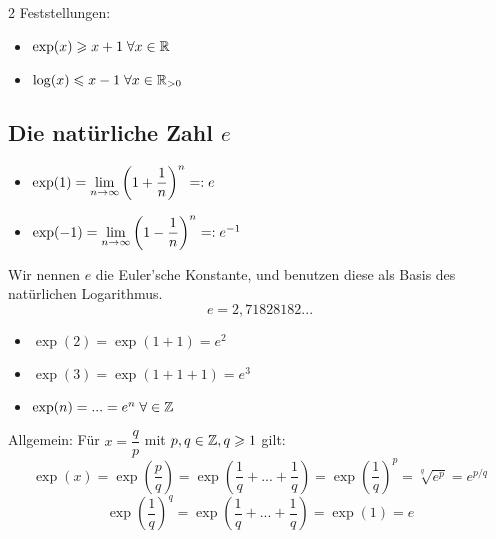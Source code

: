 \documentclass[main.tex]{subfiles}
\begin{document}
\begin{Bemerkung}[Anhang]
  2 Feststellungen:
  \begin{itemize}
    \item $\exp(x) \geqslant x + 1 \;\forall x \in \mathbb{R}$
    \item $\log(x) \leqslant x-1 \;\forall x \in \mathbb{R}_{> 0}$
  \end{itemize}
  \begin{center}
  \end{center}

\end{Bemerkung}

\subsection{Die natürliche Zahl $e$}

\begin{Definition}
  \begin{itemize}
    \item $\exp(1) = \lim \limits_{n \to \infty} \left(1 +\dfrac{1}{n}\right)^n =: e$
    \item $\exp(-1) = \lim \limits_{n \to \infty} \left(1 -\dfrac{1}{n}\right)^n =: e^{-1}$
  \end{itemize}
  Wir nennen $e$ die Euler'sche Konstante, und benutzen diese als Basis des natürlichen Logarithmus.
  $$e = 2,71828182...$$
\end{Definition}

\begin{Theorem}
  \begin{itemize}
    \item $\exp(2) = \exp(1+1) = e^2$
    \item $\exp(3) = \exp(1+1+1) = e^3$
    \item $\exp(n) = ... = e^n \;\forall \in \mathbb{Z}$
  \end{itemize}
  Allgemein: Für $x = \dfrac{q}{p}$ mit $p,q \in \mathbb{Z}, q \geqslant 1$ gilt:
  $$\exp(x) = \exp\left(\dfrac{p}{q}\right) = \exp\left(\dfrac{1}{q}+ ... + \dfrac{1}{q} \right) = \exp\left(\dfrac{1}{q}\right)^p = \sqrt[q]{e^p} = e^{p/q}$$
  $$\exp\left(\dfrac{1}{q}\right)^q = \exp\left(\dfrac{1}{q}+ ... + \dfrac{1}{q} \right) = \exp(1) = e$$
\end{Theorem}
\end{document}
